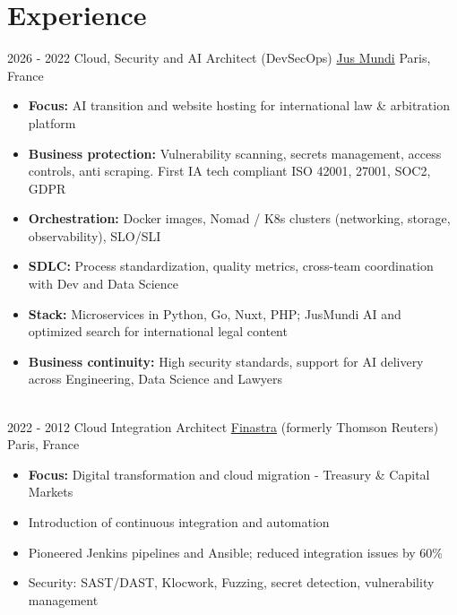 \documentclass[letterpaper]{twentysecondcv} %
\begin{document}
\makeprofile %


\section{Experience}

\begin{twentytimeline}
	\twentyitemtimeline{\faCloud}
		{2026 -}
		{2022}
		{Cloud, Security and AI Architect (DevSecOps)}
		{\href{https://www.jusmundi.com}{Jus Mundi}}
		{Paris, France}
		{\begin{itemize}
		\item \textbf{Focus:} AI transition and website hosting for international law \& arbitration platform
		\item \textbf{Business protection:} Vulnerability scanning, secrets management, access controls, anti scraping. First IA tech compliant ISO 42001, 27001, SOC2, GDPR
		\item \textbf{Orchestration:} Docker images, Nomad / K8s clusters (networking, storage, observability), SLO/SLI
		\item \textbf{SDLC:} Process standardization, quality metrics, cross-team coordination with Dev and Data Science
		\item \textbf{Stack:} Microservices in Python, Go, Nuxt, PHP; JusMundi AI and optimized search for international legal content
		\item \textbf{Business continuity:} High security standards, support for AI delivery across Engineering, Data Science and Lawyers
		\end{itemize}}
	\\
	\twentyitemtimeline{\faUsers}
		{2022 -}
		{2012}
		{Cloud Integration Architect}
		{\href{https://finastra.com}{Finastra} (formerly Thomson Reuters)}
		{Paris, France}
		{\begin{itemize}
		\item \textbf{Focus:} Digital transformation and cloud migration - Treasury \& Capital Markets
		\item Introduction of continuous integration and automation
		\item Pioneered Jenkins pipelines and Ansible; reduced integration issues by 60\%
		\item Security: SAST/DAST, Klocwork, Fuzzing, secret detection, vulnerability management

\end{itemize}}
\end{twentytimeline}
\end{document}
